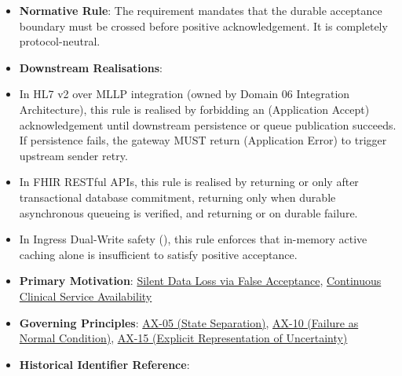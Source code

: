 \begin{itemize}


\item \textbf{Normative Rule}: The requirement mandates that the durable acceptance boundary must be crossed before positive acknowledgement. It is completely protocol-neutral.

\item \textbf{Downstream Realisations}:

\item In HL7 v2 over MLLP integration (owned by Domain 06 Integration Architecture), this rule is realised by forbidding an \texttt{} (Application Accept) acknowledgement until downstream persistence or queue publication succeeds. If persistence fails, the gateway MUST return \texttt{} (Application Error) to trigger upstream sender retry.

\item In FHIR RESTful APIs, this rule is realised by returning \texttt{} or \texttt{} only after transactional database commitment, returning \texttt{} only when durable asynchronous queueing is verified, and returning \texttt{} or \texttt{} on durable failure.

\item 

In Ingress Dual-Write safety (\texttt{}), this rule enforces that in-memory active caching alone is insufficient to satisfy positive acceptance.




\item 

\textbf{Primary Motivation}: \href{\detokenize{../../../../../docs/markdown/01-motivation/drivers-assessments/assessments.md}}{Silent Data Loss via False Acceptance}, \href{\detokenize{../../../../../docs/markdown/01-motivation/drivers-assessments/drivers.md}}{Continuous Clinical Service Availability}




\item \textbf{Governing Principles}: \hyperref[element:0412a2084f0145babc4f022c71fea65f]{AX-05 (State Separation)}, \hyperref[element:0d9673833eb840eab03804aa076c1b0c]{AX-10 (Failure as Normal Condition)}, \hyperref[element:ef8abbaec37e4890ad78b9f263e67906]{AX-15 (Explicit Representation of Uncertainty)}

\item \textbf{Historical Identifier Reference}: \texttt{}

\end{itemize}

